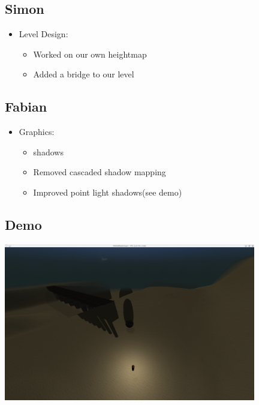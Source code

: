 \documentclass{beamer}
\begin{document}
\subsection{Simon}
\begin{frame}
    \begin{itemize}
    \item Level Design:
    \begin{itemize}
        \item Worked on our own heightmap
        \item Added a bridge to our level
    \end{itemize}
    \end{itemize}
\end{frame}

\subsection{Fabian}

\begin{frame}
    \begin{itemize}
    \item Graphics:
    \begin{itemize}
        \item {}\grqq{}  shadows
        \item Removed cascaded shadow mapping
        \item Improved point light shadows(see demo)
    \end{itemize}
    \end{itemize}
\end{frame}
\subsection{Demo}
\begin{frame}
    \includegraphics[width=11cm]{images/demo_m3}
\end{frame}
\end{document}
